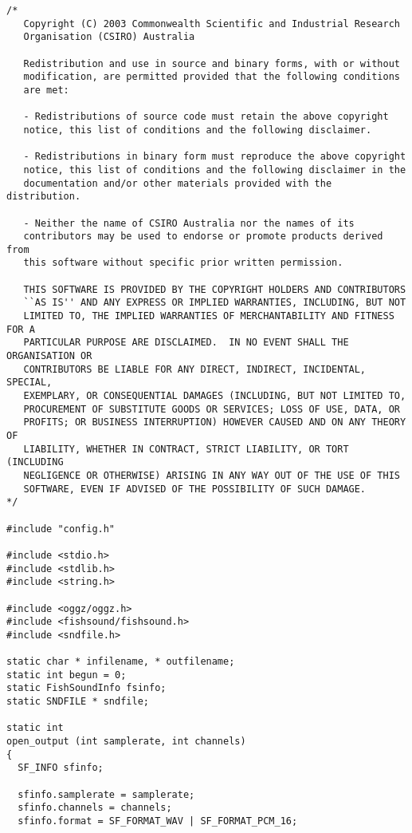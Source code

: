 \footnotesize\begin{verbatim}/*
   Copyright (C) 2003 Commonwealth Scientific and Industrial Research
   Organisation (CSIRO) Australia

   Redistribution and use in source and binary forms, with or without
   modification, are permitted provided that the following conditions
   are met:

   - Redistributions of source code must retain the above copyright
   notice, this list of conditions and the following disclaimer.

   - Redistributions in binary form must reproduce the above copyright
   notice, this list of conditions and the following disclaimer in the
   documentation and/or other materials provided with the distribution.

   - Neither the name of CSIRO Australia nor the names of its
   contributors may be used to endorse or promote products derived from
   this software without specific prior written permission.

   THIS SOFTWARE IS PROVIDED BY THE COPYRIGHT HOLDERS AND CONTRIBUTORS
   ``AS IS'' AND ANY EXPRESS OR IMPLIED WARRANTIES, INCLUDING, BUT NOT
   LIMITED TO, THE IMPLIED WARRANTIES OF MERCHANTABILITY AND FITNESS FOR A
   PARTICULAR PURPOSE ARE DISCLAIMED.  IN NO EVENT SHALL THE ORGANISATION OR
   CONTRIBUTORS BE LIABLE FOR ANY DIRECT, INDIRECT, INCIDENTAL, SPECIAL,
   EXEMPLARY, OR CONSEQUENTIAL DAMAGES (INCLUDING, BUT NOT LIMITED TO,
   PROCUREMENT OF SUBSTITUTE GOODS OR SERVICES; LOSS OF USE, DATA, OR
   PROFITS; OR BUSINESS INTERRUPTION) HOWEVER CAUSED AND ON ANY THEORY OF
   LIABILITY, WHETHER IN CONTRACT, STRICT LIABILITY, OR TORT (INCLUDING
   NEGLIGENCE OR OTHERWISE) ARISING IN ANY WAY OUT OF THE USE OF THIS
   SOFTWARE, EVEN IF ADVISED OF THE POSSIBILITY OF SUCH DAMAGE.
*/

#include "config.h"

#include <stdio.h>
#include <stdlib.h>
#include <string.h>

#include <oggz/oggz.h>
#include <fishsound/fishsound.h>
#include <sndfile.h>

static char * infilename, * outfilename;
static int begun = 0;
static FishSoundInfo fsinfo;
static SNDFILE * sndfile;

static int
open_output (int samplerate, int channels)
{
  SF_INFO sfinfo;

  sfinfo.samplerate = samplerate;
  sfinfo.channels = channels;
  sfinfo.format = SF_FORMAT_WAV | SF_FORMAT_PCM_16;


\end{verbatim}
